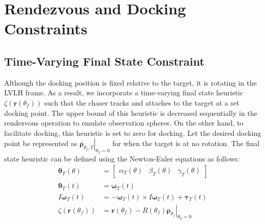 \section{Rendezvous and Docking Constraints} \label{sec:constraints}
\subsection{Time-Varying Final State Constraint}
\label{sec:time-varying-final-state-constraint}
Although the docking position is fixed relative to the target, it is rotating in the LVLH frame.
As a result, we incorporate a time-varying final state heuristic $\zeta(\boldsymbol{r}(\theta_f))$ such that the chaser tracks and attaches to the target at a set docking point.
The upper bound of this heuristic is decreased sequentially in the rendezvous operation to emulate observation spheres.
On the other hand, to facilitate docking, this heuristic is set to zero for docking.
Let the desired docking point be represented as $\left.\boldsymbol{\rho}_{\theta_f,T}\right|_{\theta_T=0}$ for when the target is at no rotation.
The final state heuristic can be defined using the Newton-Euler equations as follows:
\begin{align}
    \boldsymbol{\theta}_T(\theta)&=\begin{bmatrix}\alpha_T(\theta)&\beta_T(\theta)&\gamma_T(\theta)\end{bmatrix}\\
    \dot{\boldsymbol{\theta}}_T(t)&=\boldsymbol{\omega}_T(t)\\
    I\dot{\boldsymbol{\omega}}_T(t)&=-\boldsymbol{\omega}_T(t)\times I\boldsymbol{\omega}_T(t) + \boldsymbol{\tau}_T(t)\\
    \zeta(\boldsymbol{r}(\theta_f))&=\boldsymbol{r}(\theta_f)-\left.R(\theta_f)\boldsymbol{\rho}_{\theta_f}\right|_{\theta_T=0}
\end{align}
